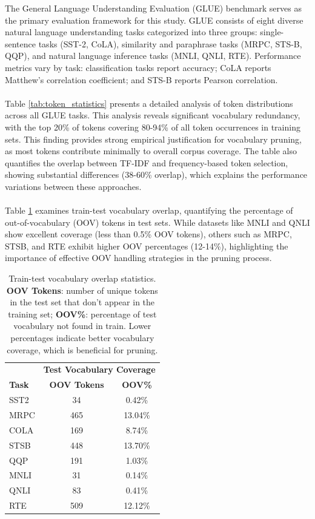 \documentclass[twocolumn]{article}
\begin{document}
The General Language Understanding Evaluation (GLUE) benchmark serves as the primary evaluation framework for this study. GLUE consists of eight diverse natural language understanding tasks categorized into three groups: single-sentence tasks (SST-2, CoLA), similarity and paraphrase tasks (MRPC, STS-B, QQP), and natural language inference tasks (MNLI, QNLI, RTE). Performance metrics vary by task: classification tasks report accuracy; CoLA reports Matthew's correlation coefficient; and STS-B reports Pearson correlation.
\\ \\
Table \ref{tab:token_statistics} presents a detailed analysis of token distributions across all GLUE tasks. This analysis reveals significant vocabulary redundancy, with the top 20\% of tokens covering 80-94\% of all token occurrences in training sets. This finding provides strong empirical justification for vocabulary pruning, as most tokens contribute minimally to overall corpus coverage. The table also quantifies the overlap between TF-IDF and frequency-based token selection, showing substantial differences (38-60\% overlap), which explains the performance variations between these approaches.
\\ \\
Table \ref{tab:vocab_overlap} examines train-test vocabulary overlap, quantifying the percentage of out-of-vocabulary (OOV) tokens in test sets. While datasets like MNLI and QNLI show excellent coverage (less than 0.5\% OOV tokens), others such as MRPC, STSB, and RTE exhibit higher OOV percentages (12-14\%), highlighting the importance of effective OOV handling strategies in the pruning process. 

\begin{table}[htbp]
\centering
\scriptsize
\setlength{\tabcolsep}{4pt}
\begin{tabular}{l|cc}
\toprule
& \multicolumn{2}{c}{\textbf{Test Vocabulary Coverage}} \\
\textbf{Task} & \textbf{OOV Tokens} & \textbf{OOV\%} \\
\midrule
SST2 & 34 & 0.42\% \\
MRPC & 465 & 13.04\% \\
COLA & 169 & 8.74\% \\
STSB & 448 & 13.70\% \\
QQP & 191 & 1.03\% \\
MNLI & 31 & 0.14\% \\
QNLI & 83 & 0.41\% \\
RTE & 509 & 12.12\% \\
\bottomrule
\end{tabular}
\caption{Train-test vocabulary overlap statistics. \textbf{OOV Tokens}: number of unique tokens in the test set that don't appear in the training set; \textbf{OOV\%}: percentage of test vocabulary not found in train. Lower percentages indicate better vocabulary coverage, which is beneficial for pruning.}
\label{tab:vocab_overlap}
\end{table}
\end{document}

